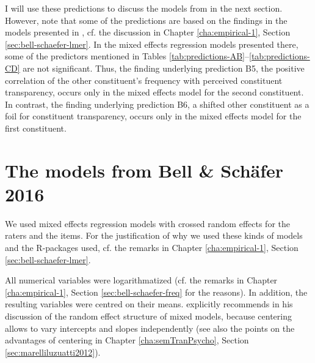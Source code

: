 \clearpage
I will use these predictions to discuss the models from
\citet{BellandSchaefer:2016} in the next section. However, note that
some of the predictions are based on the findings in the models
presented in \citet{BellandSchaefer:2013},
 cf. the discussion in Chapter \ref{cha:empirical-1}, Section \ref{sec:bell-schaefer-lmer}. In the mixed effects
regression models presented there, some of the predictors mentioned in Tables
 \ref{tab:predictions-AB}--\ref{tab:predictions-CD} are not significant. Thus, the finding
underlying prediction B5, the positive correlation of the other
constituent's frequency with perceived constituent transparency, occurs
only in the mixed effects model for the second constituent. In contrast,
the finding underlying prediction B6, a shifted other constituent as a
foil for constituent transparency, occurs only in the mixed effects
model for the first constituent. 


\section{The models from Bell \& Schäfer 2016}
\label{sec:bellandschaefer2016models}

\enlargethispage{1\baselineskip}
We used mixed effects regression models with crossed random effects for the raters and the items.
For the justification of why we used these
kinds of models and the R-packages used, cf. the
remarks in Chapter \ref{cha:empirical-1}, Section
\ref{sec:bell-schaefer-lmer}.  

All numerical variables were logarithmatized (cf. the remarks in
Chapter \ref{cha:empirical-1}, Section \ref{sec:bell-schaefer-freq}
for the reasons). In addition, the resulting
variables were centred on their means. \citet[254--255]{Baayen:2008a} explicitly
recommends  in his discussion of the random effect structure
of mixed models, because centering allows to vary intercepts and
slopes independently (see also the points on the advantages of
centering in Chapter \ref{cha:semTranPsycho}, Section
\ref{sec:marelliluzuatti2012}).   

